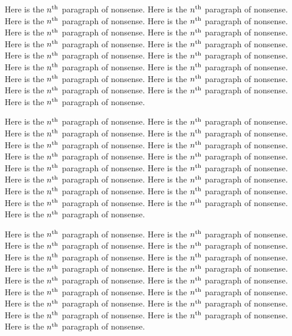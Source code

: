 Here is the $n^{\rm th}$ paragraph of nonsense.
Here is the $n^{\rm th}$ paragraph of nonsense.
Here is the $n^{\rm th}$ paragraph of nonsense.
Here is the $n^{\rm th}$ paragraph of nonsense.
Here is the $n^{\rm th}$ paragraph of nonsense.
Here is the $n^{\rm th}$ paragraph of nonsense.
Here is the $n^{\rm th}$ paragraph of nonsense.
Here is the $n^{\rm th}$ paragraph of nonsense.
Here is the $n^{\rm th}$ paragraph of nonsense.
Here is the $n^{\rm th}$ paragraph of nonsense.
Here is the $n^{\rm th}$ paragraph of nonsense.
Here is the $n^{\rm th}$ paragraph of nonsense.
Here is the $n^{\rm th}$ paragraph of nonsense.
Here is the $n^{\rm th}$ paragraph of nonsense.
Here is the $n^{\rm th}$ paragraph of nonsense.
Here is the $n^{\rm th}$ paragraph of nonsense.
Here is the $n^{\rm th}$ paragraph of nonsense.

Here is the $n^{\rm th}$ paragraph of nonsense.
Here is the $n^{\rm th}$ paragraph of nonsense.
Here is the $n^{\rm th}$ paragraph of nonsense.
Here is the $n^{\rm th}$ paragraph of nonsense.
Here is the $n^{\rm th}$ paragraph of nonsense.
Here is the $n^{\rm th}$ paragraph of nonsense.
Here is the $n^{\rm th}$ paragraph of nonsense.
Here is the $n^{\rm th}$ paragraph of nonsense.
Here is the $n^{\rm th}$ paragraph of nonsense.
Here is the $n^{\rm th}$ paragraph of nonsense.
Here is the $n^{\rm th}$ paragraph of nonsense.
Here is the $n^{\rm th}$ paragraph of nonsense.
Here is the $n^{\rm th}$ paragraph of nonsense.
Here is the $n^{\rm th}$ paragraph of nonsense.
Here is the $n^{\rm th}$ paragraph of nonsense.
Here is the $n^{\rm th}$ paragraph of nonsense.
Here is the $n^{\rm th}$ paragraph of nonsense.

Here is the $n^{\rm th}$ paragraph of nonsense.
Here is the $n^{\rm th}$ paragraph of nonsense.
Here is the $n^{\rm th}$ paragraph of nonsense.
Here is the $n^{\rm th}$ paragraph of nonsense.
Here is the $n^{\rm th}$ paragraph of nonsense.
Here is the $n^{\rm th}$ paragraph of nonsense.
Here is the $n^{\rm th}$ paragraph of nonsense.
Here is the $n^{\rm th}$ paragraph of nonsense.
Here is the $n^{\rm th}$ paragraph of nonsense.
Here is the $n^{\rm th}$ paragraph of nonsense.
Here is the $n^{\rm th}$ paragraph of nonsense.
Here is the $n^{\rm th}$ paragraph of nonsense.
Here is the $n^{\rm th}$ paragraph of nonsense.
Here is the $n^{\rm th}$ paragraph of nonsense.
Here is the $n^{\rm th}$ paragraph of nonsense.
Here is the $n^{\rm th}$ paragraph of nonsense.
Here is the $n^{\rm th}$ paragraph of nonsense.

